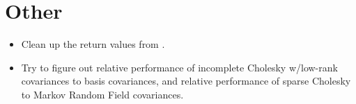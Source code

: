 \documentclass{manual}
\begin{document}
\section{Other} 
\begin{itemize}
    \item Clean up the return values from .
    \item Try to figure out relative performance of incomplete Cholesky w/low-rank covariances to basis covariances, and relative performance of sparse Cholesky to Markov Random Field covariances.
\end{itemize}



\nocite{*} 
 
 
\end{document}
